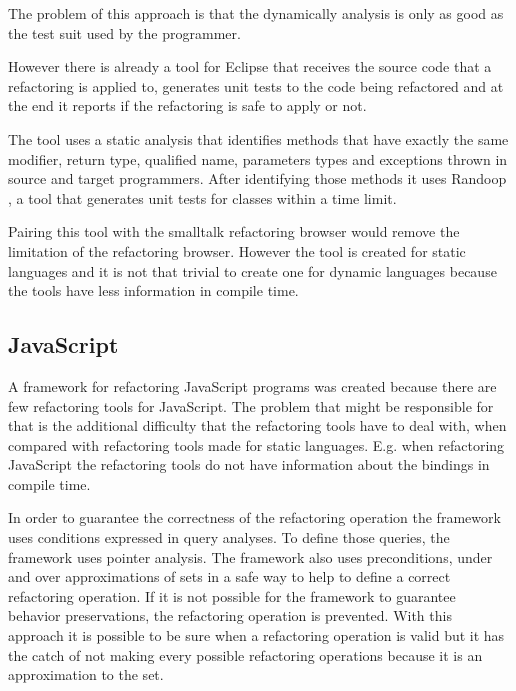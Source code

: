 The problem of this approach is that the dynamically analysis is only as good as the test suit used by the programmer.


%
However there is already a tool \cite{soares2010making} for Eclipse that receives the source code that a refactoring is applied to, generates unit tests to the code being refactored and at the end it reports if the refactoring is safe to apply or not.

The tool uses a static analysis that identifies methods that have exactly the same modifier, return type, qualified name, parameters types and exceptions thrown in source and target programmers.
After identifying those methods it uses Randoop \cite{pacheco2007feedback}, a tool that generates unit tests for classes within a time limit.

Pairing this tool with the smalltalk refactoring browser would remove the limitation of the refactoring browser.
However the tool is created for static languages and it is not that trivial to create one for dynamic languages because the tools have less information in compile time.

\subsection{JavaScript}

A framework \cite{feldthaus2011tool} for refactoring JavaScript programs was created because there are few refactoring tools for JavaScript. 
The problem that might be responsible for that is the additional difficulty that the refactoring tools have to deal with, when compared with refactoring tools made for static languages. 
E.g. when refactoring JavaScript the refactoring tools do not have information about the bindings in compile time.


In order to guarantee the correctness of the refactoring operation the framework uses conditions expressed in query analyses.
To define those queries, the framework uses pointer analysis. The framework also uses preconditions, under and over approximations of sets in a safe way to help to define a correct refactoring operation.
If it is not possible for the framework to guarantee behavior preservations, the refactoring operation is prevented.
With this approach it is possible to be sure when a refactoring operation is valid but it has the catch of not making every possible refactoring operations because it is an approximation to the set.



